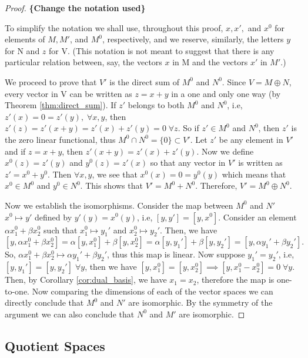 \documentclass[11pt,a4paper]{article}
\begin{document}
\begin{proof}
    \textbf{\{Change the notation used\}}
    
    To simplify the notation we shall use, throughout this proof, $x, x',$ and $x^0$ for elements of $M,M'$, and $M^0$, respectively, and we reserve, similarly, the letters $y$ for N and $z$ for V. (This notation is not meant to suggest that there is any particular relation between, say, the vectors $x$ in M and the vectors $x'$ in $M'$.)

    We proceed to prove that $V'$ is the direct sum of $M^0$ and $N^0$. Since $V=M\oplus N$, every vector in V can be written as $z=x+y$ in a one and only one way (by Theorem \ref{thm:direct_sum}). If $z'$ belongs to both $M^0$ and $N^0$, i.e, $z'(x)=0=z'(y),\;\forall x,y$, then $z'(z)=z'(x+y)=z'(x)+z'(y)=0\;\forall z$. So if $z'\in M^0$ and $N^0$, then $z'$ is the zero linear functional, thus $M^0\cap N^0=\{0\}\subset V'$.
    Let $z'$ be any element in $V'$ and if $z=x+y$, then $z'(x+y)=z'(x)+z'(y)$. Now we define $x^0(z)=z'(y)$ and $y^0(z)=z'(x)$ so that any vector in $V'$ is written as $z'=x^0+y^0$. Then $\forall x,y$, we see that $x^0(x)=0=y^0(y)$ which means that $x^0\in M^0$ and $y^0\in N^0$. This shows that $V'=M^0+N^0$. Therefore, $V'=M^0\oplus N^0$.
    
    Now we establish the isomorphisms. Consider the map between $M^0$ and $N'$ $x^0\mapsto y'$ defined by $y'(y)=x^0(y)$, i.e, $[y,y']=[y,x^0]$. Consider an element $\alpha x_1^0+\beta x_2^0$ such that $x_1^0\mapsto y_1'$ and $x_2^0\mapsto y_2'$. Then, we have
    $$
        [y,\alpha x_1^0+\beta x_2^0] = \alpha [y,x_1^0]+\beta [y,x_2^0] = \alpha [y,y_1']+\beta [y,y_2'] = [y,\alpha y_1'+\beta y_2'].
    $$
    So, $\alpha x_1^0+\beta x_2^0\mapsto \alpha y_1'+\beta y_2'$, thus this map is linear. Now suppose $y_1'=y_2'$, i.e, $[y,y_1']=[y,y_2']\;\forall y$, then we have $[y,x_1^0] = [y,x_2^0]\implies [y,x_1^0-x_2^0]=0\;\forall y$. Then, by Corollary \ref{cor:dual_basis}, we have $x_1=x_2$, therefore the map is one-to-one. Now comparing the dimensions of each of the vector spaces we can directly conclude that $M^0$ and $N'$ are isomorphic. By the symmetry of the argument we can also conclude that $N^0$ and $M'$ are isomorphic.
\end{proof}


\subsection{Quotient Spaces}
\end{document}
